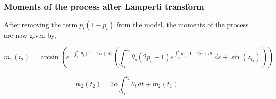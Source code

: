 \documentclass[aspectratio=169]{beamer}\usepackage[utf8]{inputenc}
\begin{document}
\begin{frame}\frametitle{ Moments of the process after Lamperti transform }
After removing the term $p_t(1-p_t)$ from the model, the moments of the process are now given by,


\begin{equation*}
m_1 (t_2) = \arcsin \left(  e^{-\int_{t_1}^{t_2} \theta_t (1-2 \alpha) \ dt  } \left( \int_{t_1}^{t_2} \theta_s (2p_s - 1)e^{ \int_{t_1}^{s} \theta_t (1-2 \alpha) \ dt  } \ ds + \sin (z_{t_1})\right)  \right)
\end{equation*}

\begin{equation*}
m_2 (t_2) =  2\alpha \int_{t_1}^{t_2}  \theta_t  \ dt + m_2(t_1)
\end{equation*}

\end{frame}

\end{document}
